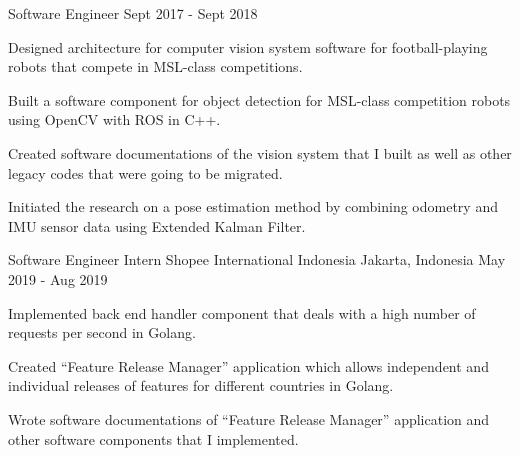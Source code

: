 \begin{cventries}
  \cventry
	{Software Engineer} %
	{} %
	{} %
	{Sept 2017 - Sept 2018} %
	{
	  \begin{cvitems} %
		\item {Designed architecture for computer vision system software for football-playing robots that compete in MSL-class competitions.}
		\item {Built a software component for object detection for MSL-class competition robots using OpenCV with ROS in C++.}
		\item {Created software documentations of the vision system that I built as well as other legacy codes that were going to be migrated.}
        \item {Initiated the research on a pose estimation method by combining odometry and IMU sensor data using Extended Kalman Filter.}
	  \end{cvitems}
	}

\cventry
{Software Engineer Intern} %
{Shopee International Indonesia} %
{Jakarta, Indonesia} %
{May 2019 - Aug 2019} %
{
	\begin{cvitems} %
		\item {Implemented back end handler component that deals with a high number of requests per second in Golang.}
		\item {Created ``Feature Release Manager'' application which allows independent and individual releases of features for different countries in Golang.}
		\item {Wrote software documentations of ``Feature Release Manager'' application and other software components that I implemented.}
	\end{cvitems}
}



\end{cventries}
